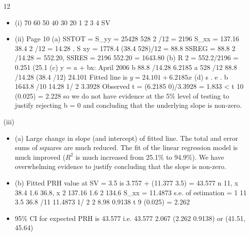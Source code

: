 \documentclass[a4paper,12pt]{article}
\begin{document}
12
\begin{itemize}
\item (i)
70
60
50
40
30
20
1
2
3
4
SV
\item (ii)
Page 10
(a)
SSTOT = S_{yy} = 25428
528 2 /12 = 2196
S_{xx} = 137.16 38.4 2 /12 = 14.28 , S xy = 1778.4 (38.4 528)/12 = 88.8
SSREG = 88.8 2 /14.28 = 552.20, SSRES = 2196 552.20 = 1643.80 
(b) R 2 = 552.2/2196 = 0.251 (25.1%
(c) y = a + bx:
April 2006
b 88.8 /14.28 6.2185
a 528 /12 88.8 /14.28 (38.4 /12)
24.101
Fitted line is $y = 24.101 + 6.2185x$
(d)
s . e . b
1643.8 /10
14.28
1/ 2
3.3928
Observed t = (6.2185 0)/3.3928 = 1.833 < t 10 (0.025) = 2.228
so we do not have evidence at the 5\% level of testing to justify rejecting b = 0 and concluding that the underlying slope is non-zero.
\end{itemize}

(iii)
\begin{itemize}
\item (a)
Large change in slope (and intercept) of fitted line.
The total and error sums of squares are much reduced.
The fit of the linear regression model is much improved ($R^2$ is much increased from 25.1\% to 94.9\%).
We have overwhelming evidence to justify concluding that the slope is non-zero.
\item (b)
Fitted PRH value at SV = 3.5 is 3.757 + (11.377 3.5) = 43.577
n 11,
x 38.4 1.6 36.8,
x 2 137.16 1.6 2 134.6
S_{xx} = 11.4873
s.e. of estimation =
1
11
3.5 36.8 /11
11.4873
1/ 2
2
8.98
0.9138
t 9 (0.025) = 2.262
\item 95\% CI for expected PRH is 43.577
i.e. 43.577
2.067
(2.262
0.9138)
or (41.51, 45.64)
\end{itemize}
\end{document}
